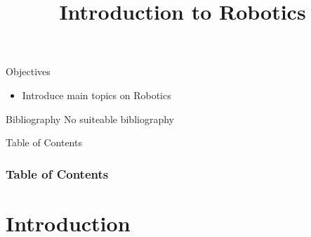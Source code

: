 \documentclass[10pt,compress]{beamer} %
\title[Introduction to Robotics]{Introduction to Robotics}
\author{}
\institute{\asignatura}
\date{}
\begin{document}
{\titlepageBlue
    \begin{frame}
        \titlepage
    \end{frame}
}

\begin{frame}[plain]{}
   \begin{block}{Objectives}
       \begin{itemize}
        \item Introduce main topics on Robotics
       \end{itemize}
   \end{block}

   \begin{block}{Bibliography}
       No suiteable bibliography
   \end{block}
\end{frame}

{
\eliminarNavegacion
\begin{frame}[shrink]{Table of Contents}
 \frametitle{Table of Contents}
 \tableofcontents
\end{frame}
}

\section{Introduction}
\end{document}
